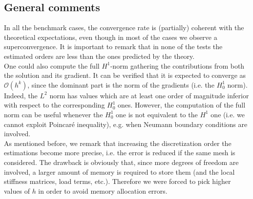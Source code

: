 \documentclass[10pt]{article}
\begin{document}
\subsection{General comments}
In all the benchmark cases, the convergence rate is (partially) coherent with the theoretical expectations, even though in most of the cases we observe a superconvergence. It is important to remark that in none of the tests the estimated orders are less than the ones predicted by the theory. \\
One could also compute the full $H^1$-norm gathering the contributions from both the solution and its gradient. It can be verified that it is expected to converge as $\mathcal{O}(h^k)$, since the dominant part is the norm of the gradients (i.e. the $H_0^1$ norm). Indeed, the $L^2$ norm has values which are at least one order of magnitude inferior with respect to the corresponding $H^1_0$ ones. However, the computation of the full norm can be useful whenever the $H^1_0$ one is not equivalent to the $H^1$ one (i.e. we cannot exploit Poincaré inequality), e.g. when Neumann boundary conditions are involved. \\
As mentioned before, we remark that increasing the discretization order the estimations become more precise, i.e. the error is reduced if the same mesh is considered. The drawback is obviously that, since more degrees of freedom are involved, a larger amount of memory is required to store them (and the local stiffness matrices, load terms, etc.). Therefore we were forced to pick higher values of $h$ in order to avoid memory allocation errors. 

\newpage
\end{document}
